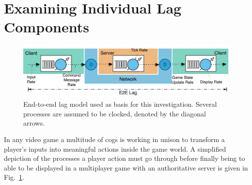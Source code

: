 \section{Examining Individual Lag Components}
\label{sec:lagmodel}

\begin{figure}[t]
	\centering
	\includegraphics[width=1.0\textwidth]{images/e2e-lag-model.pdf}
	\caption{End-to-end lag model used as basis for this investigation. Several processes are assumed to be clocked, denoted by the diagonal arrows.}
\label{fig:e2e-lag-model}
\end{figure}

In any video game a multitude of cogs is working in unison to transform a player's inputs into meaningful actions inside the game world. A simplified depiction of the processes a player action must go through before finally being to able to be displayed in a multiplayer game with an authoritative server is given in Fig.~\ref{fig:e2e-lag-model}. 

